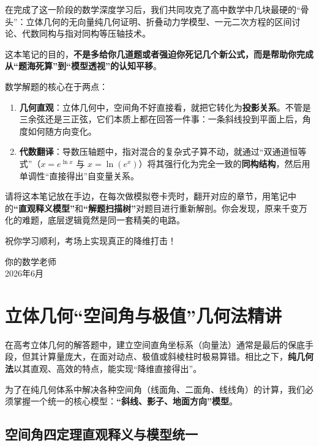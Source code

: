 \documentclass[11pt,a4paper]{ctexart}
\begin{document}
在完成了这一阶段的数学深度学习后，我们共同攻克了高中数学中几块最硬的“骨头”：立体几何的无向量纯几何证明、折叠动力学模型、一元二次方程的区间讨论、代数同构与指对同构等压轴技术。

这本笔记的目的，\textbf{不是多给你几道题或者强迫你死记几个新公式，而是帮助你完成从“题海死算”到“模型透视”的认知平移}。

数学解题的核心在于两点：
\begin{enumerate}
  \item \textbf{几何直观}：立体几何中，空间角不好直接看，就把它转化为\textbf{投影关系}。不管是三余弦还是三正弦，它们本质上都在回答一件事：一条斜线投到平面上后，角度如何随方向变化。
  \item \textbf{代数翻译}：导数压轴题中，指对混合的复杂式子算不动，就通过“双通道恒等式”（$x=e^{\ln x}$ 与 $x=\ln(e^x)$）将其强行化为完全一致的\textbf{同构结构}，然后用单调性“直接得出”自变量关系。
\end{enumerate}

请将这本笔记放在手边，在每次做模拟卷卡壳时，翻开对应的章节，用笔记中的\textbf{“直观释义模型”}和\textbf{“解题扫描树”}对题目进行重新解剖。你会发现，原来千变万化的难题，底层逻辑竟然是同一套精美的电路。

祝你学习顺利，考场上实现真正的降维打击！

\vspace{1.5em}
\begin{flushright}
  你的数学老师 \\
  2026年6月
\end{flushright}

\newpage

\section{立体几何“空间角与极值”几何法精讲}

在高考立体几何的解答题中，建立空间直角坐标系（向量法）通常是最后的保底手段，但其计算量庞大，在面对动点、极值或斜棱柱时极易算错。相比之下，\textbf{纯几何法}以其直观、高效的特点，能实现“降维直接得出”。

为了在纯几何体系中解决各种空间角（线面角、二面角、线线角）的计算，我们必须掌握一个统一的核心模型：\textbf{“斜线、影子、地面方向”模型}。

\subsection{空间角四定理直观释义与模型统一}
\end{document}
